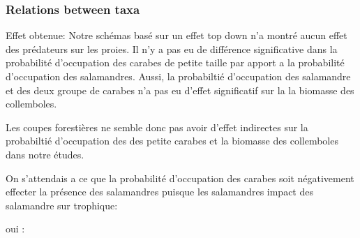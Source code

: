 \subsubsection*{Relations between taxa}
\label{disc:relations_between_taxa}

Effet obtenue:
Notre schémas basé sur un effet top down n'a montré aucun effet des prédateurs sur les proies.
Il n'y a pas eu de différence significative dans la probabilité d'occupation des carabes de petite taille par apport a la probabilité d'occupation des salamandres.
Aussi, la probabiltié d'occupation des salamandre et des deux groupe de carabes n'a pas eu d'effet significatif sur la la biomasse des collemboles.

Les coupes forestières ne semble donc pas avoir d'effet indirectes sur la probabiltié d'occupation des des petite carabes et la biomasse des collemboles dans notre études.


On s'attendais a ce que la probabilité d'occupation des carabes soit négativement effecter la présence des salamandres puisque les salamandres 
 impact des salamandre sur trophique:

 oui : 

